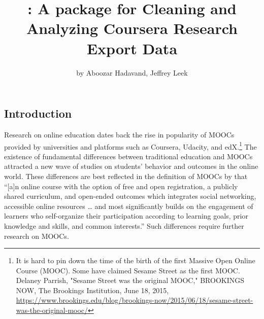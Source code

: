 \title{: A package for Cleaning and Analyzing Coursera Research
Export Data}
\author{by Aboozar Hadavand, Jeffrey Leek}

\maketitle


\subsection{Introduction}\label{introduction}

Research on online education dates back the rise in popularity of MOOCs
provided by universities and platforms such as Coursera, Udacity, and
edX.\footnote{It is hard to pin down the time of the birth of the first Massive Open Online Course (MOOC). Some have claimed Sesame Street as the first MOOC. Delaney Parrish, "Sesame Street was the original MOOC," BROOKINGS NOW, The Brookings Institution, June 18, 2015, \url{https://www.brookings.edu/blog/brookings-now/2015/06/18/sesame-street-was-the-original-mooc/}}
The existence of fundamental differences between traditional education
and MOOCs attracted a new wave of studies on students' behavior and
outcomes in the online world. These differences are best reflected in
the definition of MOOCs by \cite{mcauley2010mooc} that ``{[}a{]}n online
course with the option of free and open registration, a publicly shared
curriculum, and open-ended outcomes which integrates social networking,
accessible online resources \ldots{} and most significantly builds on
the engagement of learners who self-organize their participation
according to learning goals, prior knowledge and skills, and common
interests.'' Such differences require further research on MOOCs.

